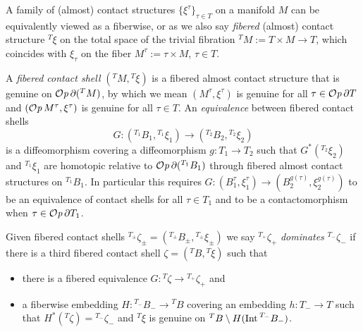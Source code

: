 \documentclass[12pt]{paper}
\theoremstyle{plain}
\theoremstyle{definition}
\newcommand{\p}{\partial}
\newcommand{\Int}{{\rm Int\,}} %
\def\Op{{\mathcal O}{\it p}\,}
\numberwithin{figure}{section}
\begin{document}
A family of (almost) contact    structures $\{\xi^\tau\}_{\tau\in T}$
 on a manifold $M$ can be  equivalently viewed as   a fiberwise, or as we also say {\em fibered} (almost) contact  structure ${}^T\!\xi$ on the total space of the trivial fibration ${}^TM:=T\times M\to T$, which coincides with $\xi_\tau$ on the fiber $M^\tau:=\tau\times M$,
   $\tau\in T$.  
  
 
A \emph{fibered contact shell} $({}^T M, {}^T\xi)$ is a fibered almost contact structure that is genuine on $\Op \p({}^T M)$,
by which we mean $(M^{\tau}, \xi^\tau)$ is genuine for all $\tau \in \Op \p T$ and $(\Op M^{\tau}, \xi^{\tau})$ is genuine for all 
$\tau \in T$.
 An {\em equivalence} between fibered contact shells 
  $$
  G: ({}^{T_1}B_1 ,{}^{T_1}\xi_1) \to ({}^{T_2}B_2 ,{}^{T_2}\xi_2)
  $$ 
  is a diffeomorphism covering a diffeomorphism $g:T_1\to T_2$ such that
  $G^*\left({}^{T_2}\xi_2\right)$ and ${}^{T_1}\xi_1$ are homotopic relative to $\Op \p({}^{T_1}B_1)$
   through fibered almost contact structures on ${}^{T_1}B_1$. 
  In particular this requires $G: (B_1^{\tau}, \xi_1^{\tau}) \to (B_2^{g(\tau)}, \xi_2^{g(\tau)})$ to be an equivalence of contact shells for all 
  $\tau \in T_1$
  and to be a contactomorphism when $\tau \in \Op \p T_1$.
  
    Given fibered contact shells 
       ${}^{T_\pm}\zeta_\pm=\left({}^{T_\pm}B_\pm,{}^{T_\pm}\xi_\pm\right)$ 
       we say ${}^{T_+}\zeta_+$ \emph{dominates} ${}^{T_-}\zeta_-$
       if there is a third fibered contact shell $\zeta=\left({}^T B,{}^T\xi\right)$ such that
\begin{itemize}
\item there is a fibered equivalence   $G:{}^{T}\zeta \to {}^{T_+} \zeta_+$ and
\item a fiberwise embedding $ H: {}^{T_-}B_-\to{}^{T}  B$ covering an embedding $h:  T_-\to T$
such that $H^*({}^{T}\zeta)= {}^{T_-}\zeta_{-}$ and ${}^T \xi$ is genuine on $^TB\setminus H(\Int ^{T_-}B_-)$.  
  \end{itemize}
               
\end{document}
